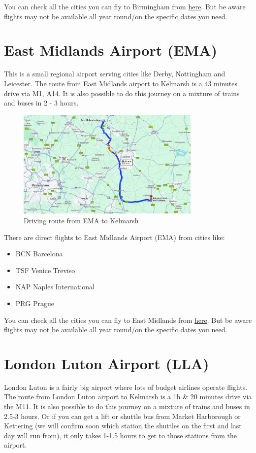 \documentclass[a4paper, 11pt]{article}
\begin{document}
You can check all the cities you can fly to Birmingham from \href{https://www.birminghamairport.co.uk/destinations-and-more/where-we-fly/}{here}. But be aware flights may not be available all year round/on the specific dates you need.

\section{East Midlands Airport (EMA)}
This is a small regional airport serving cities like Derby, Nottingham and Leicester. The route from East Midlands airport to Kelmarsh is a 43 minutes drive via M1, A14. It is also possible to do this journey on a mixture of trains and buses in 2 - 3 hours.

\begin{figure}[H]
    \centering
    \includegraphics[width=0.8\textwidth]{assets/ema.png}
    \caption{Driving route from EMA to Kelmarsh}
\end{figure}

There are direct flights to East Midlands Airport (EMA) from cities like:
\begin{multicols}{2}
    \begin{itemize}
        \item BCN Barcelona 
        \item TSF Venice Treviso
        \item NAP Naples International
        \item PRG Prague
    \end{itemize}
\end{multicols}

You can check all the cities you can fly to East Midlands from \href{https://www.eastmidlandsairport.com/destinations-and-guides/a-z-list-of-destinations/}{here}. But be aware flights may not be available all year round/on the specific dates you need.

\section{London Luton Airport (LLA)}
London Luton is a fairly big airport where lots of budget airlines operate flights. The route from London Luton airport to Kelmarsh is a 1h \& 20 minutes drive via the M11. It is also possible to do this journey on a mixture of trains and buses in 2.5-3 hours. Or if you can get a lift or shuttle bus from Market Harborough or Kettering (we will confirm soon which station the shuttles on the first and last day will run from), it only takes 1-1.5 hours to get to those stations from the airport. 
\end{document}
